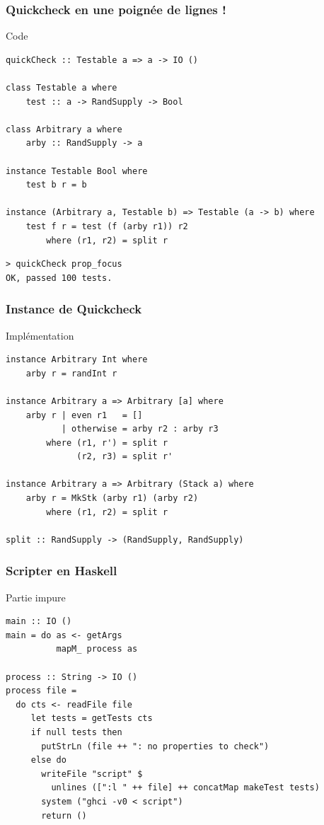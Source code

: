 \documentclass[10pt]{beamer}
\begin{document}
\begin{frame}[fragile]
\frametitle{Quickcheck en une poignée de lignes !}

\begin{block}{Code}
\begin{verbatim}
quickCheck :: Testable a => a -> IO ()

class Testable a where
    test :: a -> RandSupply -> Bool

class Arbitrary a where
    arby :: RandSupply -> a

instance Testable Bool where
    test b r = b

instance (Arbitrary a, Testable b) => Testable (a -> b) where
    test f r = test (f (arby r1)) r2
        where (r1, r2) = split r
\end{verbatim}
\end{block}

\begin{verbatim}
> quickCheck prop_focus
OK, passed 100 tests.
\end{verbatim}

\end{frame}



\begin{frame}[fragile]
\frametitle{Instance de Quickcheck}
\begin{block}{Implémentation}
\begin{verbatim}
instance Arbitrary Int where
    arby r = randInt r

instance Arbitrary a => Arbitrary [a] where
    arby r | even r1   = []
           | otherwise = arby r2 : arby r3
        where (r1, r') = split r
              (r2, r3) = split r'

instance Arbitrary a => Arbitrary (Stack a) where
    arby r = MkStk (arby r1) (arby r2)
        where (r1, r2) = split r

split :: RandSupply -> (RandSupply, RandSupply)
\end{verbatim}
\end{block}
\end{frame}



\begin{frame}[fragile]
\frametitle{Scripter en Haskell}
\begin{block}{Partie impure}
\begin{verbatim}
main :: IO ()
main = do as <- getArgs
          mapM_ process as

process :: String -> IO ()
process file =
  do cts <- readFile file
     let tests = getTests cts
     if null tests then
       putStrLn (file ++ ": no properties to check")
     else do
       writeFile "script" $
         unlines ([":l " ++ file] ++ concatMap makeTest tests)
       system ("ghci -v0 < script")
       return ()
\end{verbatim}
\end{block}
\end{frame}
\end{document}
